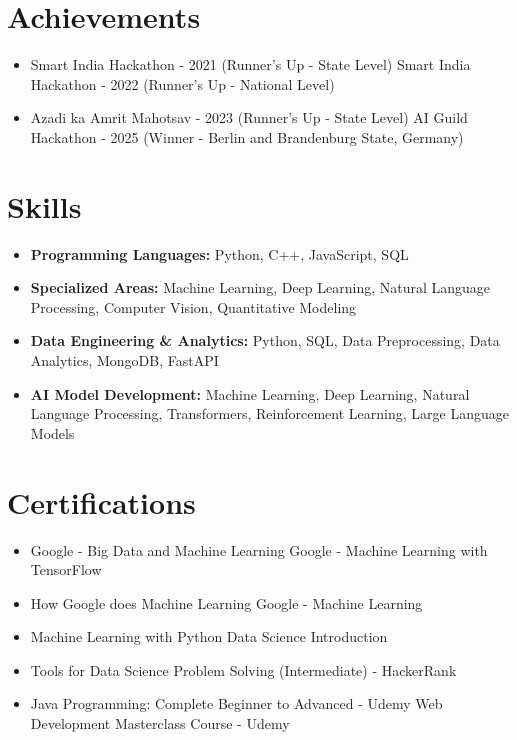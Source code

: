 \documentclass[a4paper,10pt]{article}
\begin{document}
\section*{Achievements}
\begin{itemize}
\item Smart India Hackathon - 2021 (Runner's Up - State Level) \hfill Smart India Hackathon - 2022 (Runner's Up - National Level)
\item Azadi ka Amrit Mahotsav - 2023 (Runner's Up - State Level) \hfill AI Guild Hackathon - 2025 (Winner - Berlin and Brandenburg State, Germany)
\end{itemize}

\section*{Skills}
\begin{itemize}
  \item \textbf{Programming Languages:} Python, C++, JavaScript, SQL
  \item \textbf{Specialized Areas:} Machine Learning, Deep Learning, Natural Language Processing, Computer Vision, Quantitative Modeling
  \item \textbf{Data Engineering \& Analytics:} Python, SQL, Data Preprocessing, Data Analytics, MongoDB, FastAPI
  \item \textbf{AI Model Development:} Machine Learning, Deep Learning, Natural Language Processing, Transformers, Reinforcement Learning, Large Language Models
\end{itemize}

\section*{Certifications}
\begin{itemize}
\item Google - Big Data and Machine Learning \hfill Google - Machine Learning with TensorFlow
\item How Google does Machine Learning \hfill Google - Machine Learning
\item Machine Learning with Python \hfill Data Science Introduction
\item Tools for Data Science \hfill Problem Solving (Intermediate) - HackerRank
\item Java Programming: Complete Beginner to Advanced - Udemy \hfill Web Development Masterclass Course - Udemy
\end{itemize}
\end{document}
